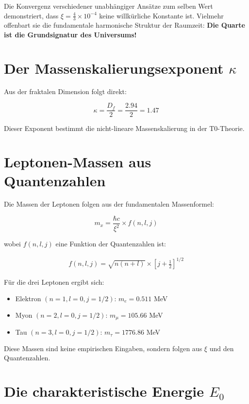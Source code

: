 \documentclass[12pt,a4paper]{article}
\newcommand{\xipar}{\xi}                    %
\theoremstyle{definition}
\begin{document}
Die Konvergenz verschiedener unabh\"angiger Ans\"atze zum selben Wert demonstriert, dass $\xipar = \frac{4}{3} \times 10^{-4}$ keine willk\"urliche Konstante ist. Vielmehr offenbart sie die fundamentale harmonische Struktur der Raumzeit: \textbf{Die Quarte ist die Grundsignatur des Universums!}
	\section{Der Massenskalierungsexponent $\kappa$}
	
	Aus der fraktalen Dimension folgt direkt:
	
	\begin{equation}
		\kappa = \frac{D_f}{2} = \frac{2.94}{2} = 1.47
	\end{equation}
	
	Dieser Exponent bestimmt die nicht-lineare Massenskalierung in der T0-Theorie.
	
	\section{Leptonen-Massen aus Quantenzahlen}
	
	Die Massen der Leptonen folgen aus der fundamentalen Massenformel:
	
	\begin{equation}
		m_x = \frac{\hbar c}{\xi^2} \times f(n, l, j)
	\end{equation}
	
	wobei $f(n, l, j)$ eine Funktion der Quantenzahlen ist:
	
	\begin{align}
		f(n, l, j) = \sqrt{n(n+l)} \times \left[j + \frac{1}{2}\right]^{1/2}
	\end{align}
	
	F\"ur die drei Leptonen ergibt sich:
	
	\begin{itemize}
		\item Elektron $(n=1, l=0, j=1/2)$: $m_e = 0.511$ MeV
		\item Myon $(n=2, l=0, j=1/2)$: $m_\mu = 105.66$ MeV
		\item Tau $(n=3, l=0, j=1/2)$: $m_\tau = 1776.86$ MeV
	\end{itemize}
	
	Diese Massen sind keine empirischen Eingaben, sondern folgen aus $\xi$ und den Quantenzahlen.
	
	\section{Die charakteristische Energie $E_0$}
	
\end{document}
